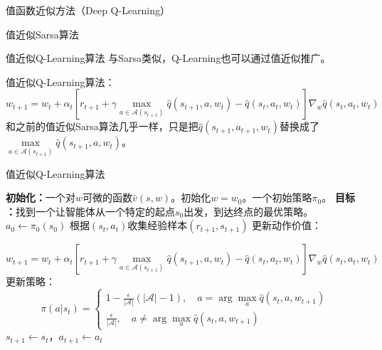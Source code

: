 \begin{section}{值函数近似方法\alert{（Deep Q-Learning）}}
\begin{frame}{值近似Sarsa算法}
\begin{center}
\begin{minipage}{0.3\textwidth}
        \end{minipage}
    \end{center}
    
\end{frame}

\begin{frame}{值近似Q-Learning算法}
    与Sarsa类似，Q-Learning也可以通过值近似推广。

    值近似Q-Learning算法：
    \alert{\[
        w_{t+1}=w_t+\alpha_t\left[r_{t+1}+\gamma \underset{a\in \mathcal{A}(s_{t+1})}{\max}\hat{q}(s_{t+1},a,w_t)-\hat{q}(s_t,a_t,w_t)\right]\nabla_w\hat{q}(s_t,a_t,w_t)
    \]}
    和之前的值近似Sarsa算法几乎一样，只是把$\hat{q}(s_{t+1},a_{t+1},w_t)$替换成了$\underset{a\in \mathcal{A}(s_{t+1})}{\max}\hat{q}(s_{t+1},a,w_t)$。
\end{frame}

\begin{frame}{值近似Q-Learning算法}
    \begin{algorithmic}[1]
        \State \textbf{初始化：}一个对$w$可微的函数$\hat{v}(s,w)$。初始化$w=w_0$。一个初始策略$\pi_0$。
        \State \textbf{目标 ：}找到一个让智能体从一个特定的起点$s_0$出发，到达终点的最优策略。
            \State $a_0\leftarrow\pi_0(s_0)$
                \State 根据$(s_t,a_t)$收集经验样本$(r_{t+1}, s_{t+1})$
                \State 更新动作价值：

                $w_{t+1}=w_t+\alpha_t[r_{t+1}+\gamma \underset{a\in \mathcal{A}(s_{t+1})}{\max}\hat{q}(s_{t+1},a,w_t)-\hat{q}(s_t,a_t,w_t)]\nabla_w\hat{q}(s_t,a_t,w_t)$
                \State 更新策略：
                \[
                    \pi(a|s_t)=\begin{cases}
                        1-\frac{\epsilon}{|\mathcal{A}|}(|\mathcal{A}|-1),\quad a=\arg\max_{a}\hat{q}(s_t,a,w_{t+1}) \\
                        \frac{\epsilon}{|\mathcal{A}|},\quad a \neq \arg\max_{a}\hat{q}(s_t,a,w_{t+1})
                    \end{cases}
                \]
                \State $s_{t+1}\leftarrow s_t$，$a_{t+1}\leftarrow a_t$
            \EndWhile
        \EndFor
    \end{algorithmic}
\end{frame}


\end{section}
